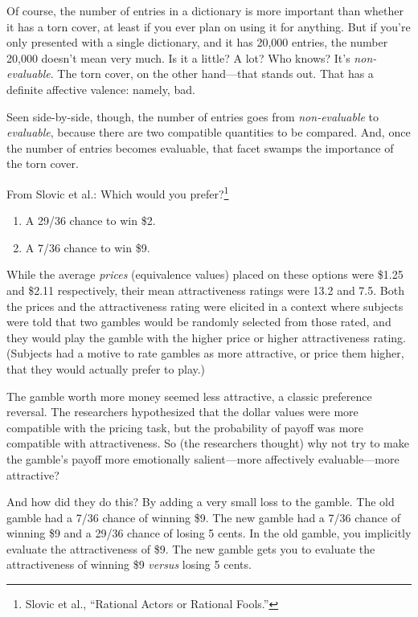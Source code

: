 {
 Of course, the number of entries in a dictionary is more important
than whether it has a torn cover, at least if you ever plan on using it
for anything. But if you're only presented with a
single dictionary, and it has 20,000 entries, the number 20,000
doesn't mean very much. Is it a little? A lot? Who
knows? It's \textit{non-evaluable}. The torn cover, on
the other hand---that stands out. That has a definite affective
valence: namely, bad.}

{
 Seen side-by-side, though, the number of entries goes from
\textit{non-evaluable} to \textit{evaluable}, because there are two
compatible quantities to be compared. And, once the number of entries
becomes evaluable, that facet swamps the importance of the torn cover.}

{
 From Slovic et al.: Which would you prefer?\footnote{Slovic et al., ``Rational Actors or Rational
Fools.''}}

\begin{enumerate}
\item A 29/36 chance to win \$2.
\item  A 7/36 chance to win \$9.
\end{enumerate}

{
 While the average \textit{prices} (equivalence values) placed on
these options were \$1.25 and \$2.11 respectively, their mean
attractiveness ratings were 13.2 and 7.5. Both the prices and the
attractiveness rating were elicited in a context where subjects were
told that two gambles would be randomly selected from those rated, and
they would play the gamble with the higher price or higher
attractiveness rating. (Subjects had a motive to rate gambles as more
attractive, or price them higher, that they would actually prefer to
play.)}

{
 The gamble worth more money seemed less attractive, a classic
preference reversal. The researchers hypothesized that the dollar
values were more compatible with the pricing task, but the probability
of payoff was more compatible with attractiveness. So (the researchers
thought) why not try to make the gamble's payoff more
emotionally salient---more affectively evaluable---more attractive?}

{
 And how did they do this? By adding a very small loss to the
gamble. The old gamble had a 7/36 chance of winning \$9. The new gamble
had a 7/36 chance of winning \$9 and a 29/36 chance of losing 5 cents.
In the old gamble, you implicitly evaluate the attractiveness of \$9.
The new gamble gets you to evaluate the attractiveness of winning \$9
\textit{versus} losing 5 cents.}


